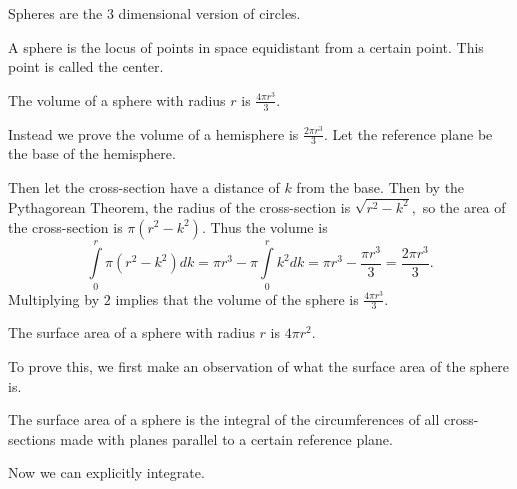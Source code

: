 Spheres are the $3$ dimensional version of circles.
\begin{defi}[Sphere]
A sphere is the locus of points in space equidistant from a certain point. This point is called the center.
\begin{center}
\end{center}
\end{defi}

\begin{theo}
The volume of a sphere with radius $r$ is $\frac{4\pi r^3}{3}.$
\end{theo}

\begin{pro}
Instead we prove the volume of a hemisphere is $\frac{2\pi r^3}{3}.$ Let the reference plane be the base of the hemisphere.

Then let the cross-section have a distance of $k$ from the base. Then by the Pythagorean Theorem, the radius of the cross-section is $\sqrt{r^2-k^2},$ so the area of the cross-section is $\pi(r^2-k^2).$ Thus the volume is \[\int\limits_{0}^{r}\pi(r^2-k^2)dk=\pi r^3-\pi \int\limits_{0}^{r}k^2dk=\pi r^3-\frac{\pi r^3}{3}=\frac{2\pi r^3}{3}.\]
Multiplying by $2$ implies that the volume of the sphere is $\frac{4\pi r^3}{3}.$
\end{pro}

\begin{theo}
The surface area of a sphere with radius $r$ is $4\pi r^2.$
\end{theo}

To prove this, we first make an observation of what the surface area of the sphere is.

\begin{fact}
The surface area of a sphere is the integral of the circumferences of all cross-sections made with planes parallel to a certain reference plane.
\end{fact}

Now we can explicitly integrate.

